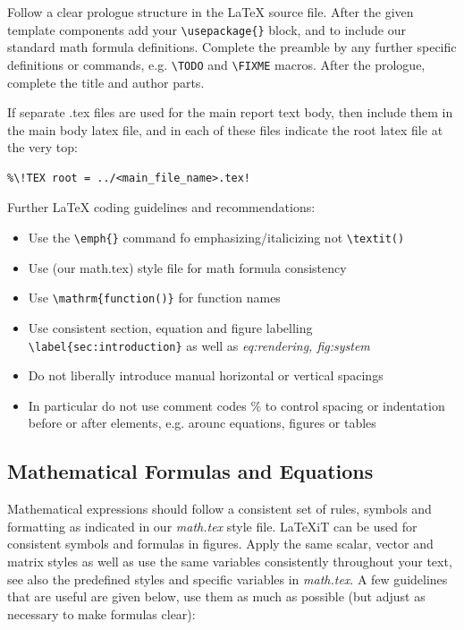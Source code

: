 \documentclass[11pt, a4paper,oneside,chapterprefix=false]{scrbook}
\newcommand{\FIXME}[1]{{\color{RED}{\textbf{FIX}: #1}}}
\begin{document}
Follow a clear prologue structure in the LaTeX source file. After the given template components add your \verb!\usepackage{}! block, and \verb!! to include our standard math formula definitions. Complete the preamble by any further specific definitions or commands, e.g. \verb!\TODO! and \verb!\FIXME! macros. After the prologue, complete the title and author parts.

If separate .tex files are used for the main report text body, then include them in the main body latex file, and in each of these files indicate the root latex file at the very top:
\begin{verbatim}
%\!TEX root = ../<main_file_name>.tex!
\end{verbatim}

\noindent
Further LaTeX coding guidelines and recommendations:

\begin{itemize}
\item Use the \verb!\emph{}! command fo emphasizing/italicizing not \verb!\textit()!
\item Use (our math.tex) style file for math formula consistency
\item Use \verb!\mathrm{function()}!  for function names
\item Use consistent section, equation and figure labelling
\verb!\label{sec:introduction}! as well as \textit{eq:rendering, fig:system}
\item Do not liberally introduce manual horizontal or vertical spacings
\item In particular do not use comment codes \% to control spacing or indentation before or after elements, e.g. arounc equations, figures or tables
\end{itemize}

\subsection*{Mathematical Formulas and Equations}

Mathematical expressions should follow a consistent set of rules, symbols and formatting as indicated in our \textit{math.tex} style file. LaTeXiT can be used for consistent symbols and formulas in figures. Apply the same scalar, vector and matrix styles as well as use the same variables consistently throughout your text, see also the predefined styles and specific variables in \textit{math.tex}. A few guidelines that are useful are given below, use them as much as possible (but adjust as necessary to make formulas clear):
\end{document}
